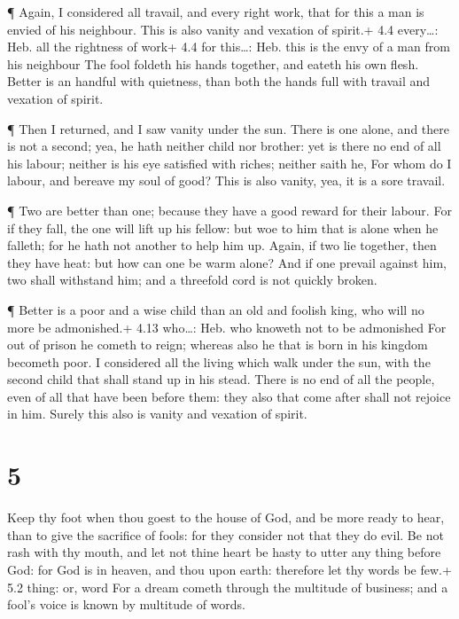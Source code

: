  ¶ Again, I considered all travail, and every right work,
that for this a man is envied of his neighbour. This is also vanity and
vexation of spirit.+ 4.4 every\ldots: Heb. all the rightness of work+
4.4 for this\ldots: Heb. this is the envy of a man from his neighbour
 The fool foldeth his hands together, and eateth his own
flesh.  Better is an handful with quietness, than both the
hands full with travail and vexation of spirit.

 ¶ Then I returned, and I saw vanity under the sun.
 There is one alone, and there is not a second; yea, he hath
neither child nor brother: yet is there no end of all his labour;
neither is his eye satisfied with riches; neither saith he, For whom do
I labour, and bereave my soul of good? This is also vanity, yea, it is a
sore travail.

 ¶ Two are better than one; because they have a good reward
for their labour.  For if they fall, the one will lift up
his fellow: but woe to him that is alone when he falleth; for he hath
not another to help him up.  Again, if two lie together,
then they have heat: but how can one be warm alone?  And if
one prevail against him, two shall withstand him; and a threefold cord
is not quickly broken.

 ¶ Better is a poor and a wise child than an old and
foolish king, who will no more be admonished.+ 4.13 who\ldots: Heb. who
knoweth not to be admonished  For out of prison he cometh
to reign; whereas also he that is born in his kingdom becometh poor.
 I considered all the living which walk under the sun, with
the second child that shall stand up in his stead.  There
is no end of all the people, even of all that have been before them:
they also that come after shall not rejoice in him. Surely this also is
vanity and vexation of spirit.

\hypertarget{section-4}{%
\section{5}\label{section-4}}

 Keep thy foot when thou goest to the house of God, and be
more ready to hear, than to give the sacrifice of fools: for they
consider not that they do evil.  Be not rash with thy mouth,
and let not thine heart be hasty to utter any thing before God: for God
is in heaven, and thou upon earth: therefore let thy words be few.+ 5.2
thing: or, word  For a dream cometh through the multitude of
business; and a fool's voice is known by multitude of words.

